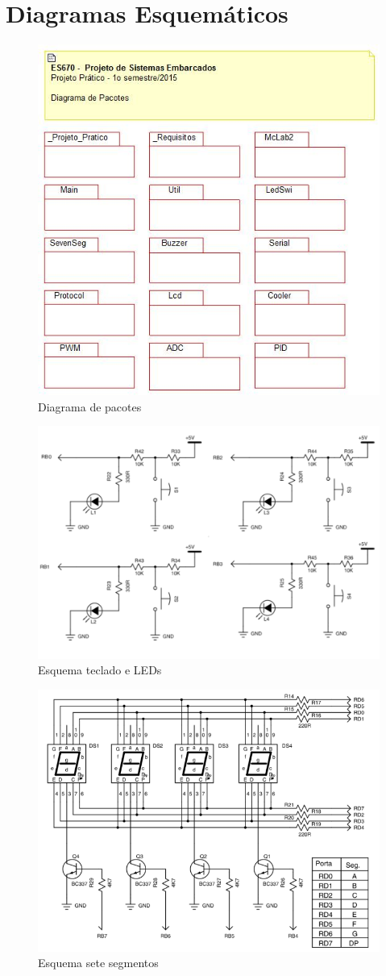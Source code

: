 \documentclass{article}
\begin{document}
\section{Diagramas Esquemáticos}

\begin{figure}[H]
	\centering
	\includegraphics[width=0.7\linewidth]{pacotes}
	\caption{Diagrama de pacotes}
	\label{fig:pacotes}
\end{figure}
\begin{figure}[H]
	\centering
	\includegraphics[width=0.7\linewidth]{esq_ledswi}
	\caption{Esquema teclado e LEDs}
	\label{fig:esq_ledswi}
\end{figure}
\begin{figure}[H]
	\centering
	\includegraphics[width=0.9\linewidth]{esq_7seg}
	\caption{Esquema sete segmentos}
	\label{fig:esq_7seg}
\end{figure}
\end{document}
